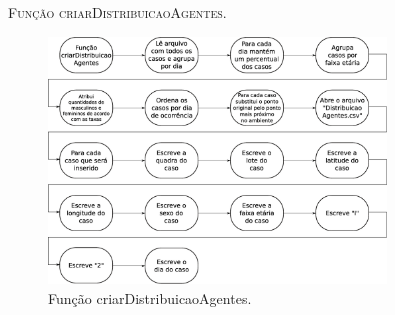 

\begin{algorithm}[H]
   \SetAlgoLined   
   
   \caption{\textsc{Função criarDistribuicaoAgentes.}}
   \label{alg:criarDistribuicaoAgentes}
\end{algorithm}

\begin{figure}[H]
  \centering
  \includegraphics[width=0.8\textwidth]{Figuras/Simula/Fluxos/criarDistribuicaoAgentes.eps}
  \caption{Função criarDistribuicaoAgentes.}
  \label{fig:criarDistribuicaoAgentes}
\end{figure} 

\newpage
